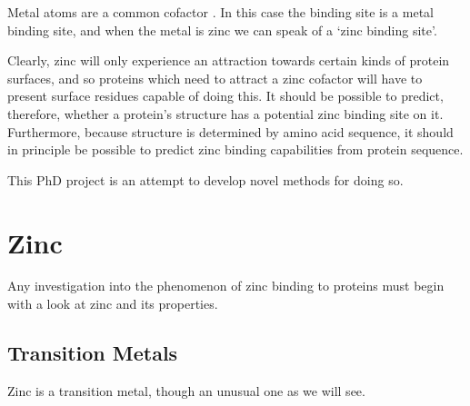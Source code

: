 Metal atoms are a common cofactor . In this case the binding site is a metal binding site, and when the metal is zinc we can speak of a `zinc binding site'.

Clearly, zinc will only experience an attraction towards certain kinds of protein surfaces, and so proteins which need to attract a zinc cofactor will have to present surface residues capable of doing this. It should be possible to predict, therefore, whether a protein's structure has a potential zinc binding site on it. Furthermore, because structure is determined by amino acid sequence, it should in principle be possible to predict zinc binding capabilities from protein sequence.

This PhD project is an attempt to develop novel methods for doing so.

\section{Zinc}

Any investigation into the phenomenon of zinc binding to proteins must begin with a look at zinc and its properties.

\subsection{Transition Metals}

Zinc is a transition metal, though an unusual one as we will see.

